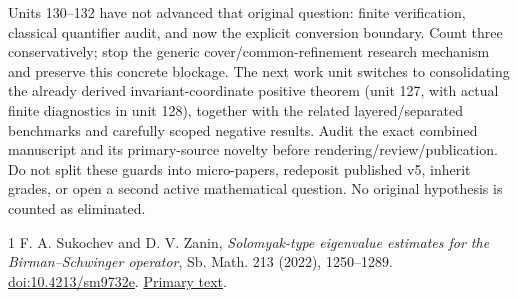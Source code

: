 \documentclass[11pt]{article}
\begin{document}
Units 130--132 have not advanced that original question: finite verification,
classical quantifier audit, and now the explicit conversion boundary. Count
three conservatively; stop the generic cover/common-refinement research
mechanism and preserve this concrete blockage. The next work unit switches
to consolidating the already derived invariant-coordinate positive theorem
(unit 127, with actual finite diagnostics in unit 128), together with the
related layered/separated benchmarks and carefully scoped negative results.
Audit the exact combined manuscript and its primary-source novelty before
rendering/review/publication. Do not split these guards into micro-papers,
redeposit published v5, inherit grades, or open a second active mathematical
question. No original hypothesis is counted as eliminated.

\begin{thebibliography}{1}
 F. A. Sukochev and D. V. Zanin,
\emph{Solomyak-type eigenvalue estimates for the Birman--Schwinger operator},
Sb. Math. 213 (2022), 1250--1289.
\href{https://doi.org/10.4213/sm9732e}{doi:10.4213/sm9732e}.
\href{https://www.mathnet.ru/php/archive.phtml?jrnid=sm\&option_lang=eng\&paperid=9732\&wshow=paper}{Primary text}.
\end{thebibliography}
\end{document}
